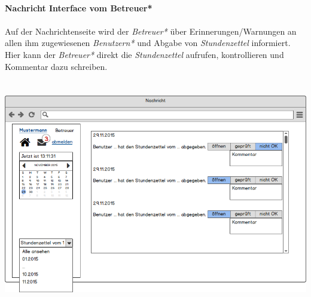 \newpage
\textbf{\\Nachricht Interface vom Betreuer*}\\
\\
Auf der Nachrichtenseite wird der \emph{Betreuer*} über Erinnerungen/Warnungen an allen ihm zugewiesenen \emph{Benutzern*} und Abgabe von \emph{Stundenzettel} informiert.\\
Hier kann der \emph{Betreuer*} direkt die \emph{Stundenzettel} aufrufen, kontrollieren und Kommentar dazu schreiben.\\
\\
\\
\includegraphics[width=\linewidth]{UI/Betreuer/Nachricht.png}

\newpage
